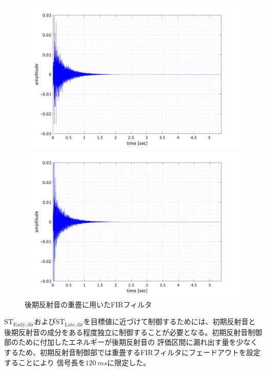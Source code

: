 \documentclass[11pt,a4j]{jreport}
\begin{document}
\begin{figure}[H]
      \begin{minipage}[b]{.5\linewidth}
          \centering
          \includegraphics[width=.9\linewidth]{images/convolutedIr/REV3.png}
      \end{minipage}%
      \begin{minipage}[b]{.5\linewidth}
          \centering
          \includegraphics[width=.9\linewidth]{images/convolutedIr/REV4.png}
      \end{minipage}

      \centering
      \caption{後期反射音の重畳に用いたFIRフィルタ}
      \label{fig:後期反射音の重畳に用いたフィルタ}
    \end{figure}

    $\mathrm{ST_{Early,dir}}$および$\mathrm{ST_{Late,dir}}$を目標値に近づけて制御するためには、初期反射音と
    後期反射音の成分をある程度独立に制御することが必要となる。初期反射音制御部のために付加したエネルギーが後期反射音の
    評価区間に漏れ出す量を少なくするため、初期反射音制御部では重畳するFIRフィルタにフェードアウトを設定することにより
    信号長を$\SI{120}{ms}$に限定した。
    
\end{document}
